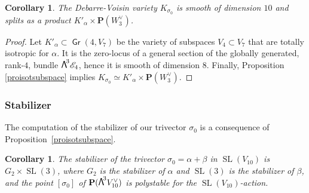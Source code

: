 \documentclass[JEP,XML,SOM,Unicode, NoEqCountersInSection,NoFloatCountersInSection]{cedram}
\let\mathcal\mathscr
\newtheorem{coro}[lemm]{Corollary}
\theoremstyle{definition}
\renewcommand\P{{\mathbf P}}\let\PP\P
\newcommand\cE{\mathcal{E}}
\DeclareMathOperator{\Gr}{\mathsf{Gr}}
\let\cong\simeq
\DeclareMathOperator{\SL}{SL}
\newcommand\bw[1]{{\hbox{\large$\mathsf{\Lambda}$}^{\!#1}}}
\begin{document}
\begin{coro}\label{corokalphabeta}
The Debarre-Voisin variety
$K_{\sigma_0}$ is smooth of dimension $10$ and splits as a product $K'_\alpha\times \P(W_3^\vee)$.
\end{coro}

\begin{proof} Let $K'_{\alpha}\subset \Gr(4,V_7)$ be the variety of subspaces
$V_4\subset V_7$ that are totally isotropic for $\alpha$. It is the zero-locus of a general section of the globally generated, rank\nobreakdash-$4$, bundle $\bw3\cE_4$, hence it is smooth of dimension $8$. Finally, Proposition
\ref{proisotsubspace} implies $K_{\sigma_0}\cong K'_\alpha\times \P(W_3^\vee)$.
\end{proof}

\subsubsection{Stabilizer}\label{orbetstab2}

The computation of the stabilizer of our trivector $\sigma_0$ is a consequence of Proposition~\ref{proisotsubspace}.

\begin{coro}\label{lestabgenus10}
The stabilizer of the trivector $\sigma_0 =\alpha+\beta$ in
$\SL(V_{10})$ is
$G_2\times \SL(3)$, where $G_2$ is the stabilizer of $\alpha$ and $\SL(3)$ is the stabilizer of $\beta$, and the point $[\sigma_0]$ of $\P(\bw3V_{10}^\vee)$ is polystable for the $\SL(V_{10})$-action.
\end{coro}
\end{document}
